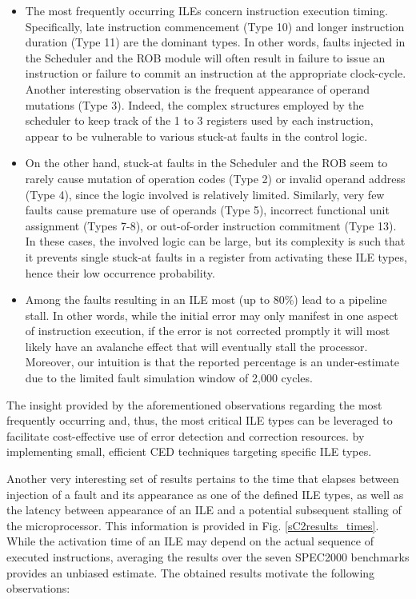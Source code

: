 \documentclass[12pt]{yalephd}
\newcommand{\snp}[1] {\noindent {\underline {#1}}}
\begin{document}
\begin{itemize}
\item The most frequently occurring ILEs concern instruction execution timing. Specifically, late instruction commencement (Type 10) and longer instruction duration (Type 11) are the dominant types. In other words, faults injected in the Scheduler and the ROB module will often result in failure to issue an instruction or failure to commit an instruction at the appropriate clock-cycle. Another interesting observation is the frequent appearance of operand mutations (Type 3). Indeed, the complex structures employed by the scheduler to keep track of the 1 to 3 registers used by each instruction, appear to be vulnerable to various stuck-at faults in the control logic.
\item On the other hand, stuck-at faults in the Scheduler and the ROB seem to rarely cause mutation of operation codes (Type 2) or invalid operand address (Type 4), since the logic involved is relatively limited. Similarly, very few faults cause premature use of operands (Type 5), incorrect functional unit assignment (Types 7-8), or out-of-order instruction commitment (Type 13). In these cases, the involved logic can be large, but its complexity is such that it prevents single stuck-at faults in a register from activating these ILE types, hence their low occurrence probability.
\item Among the faults resulting in an ILE most (up to 80\%) lead to a pipeline stall. In other words, while the initial error may only manifest in one aspect of instruction execution, if the error is not corrected promptly it will most likely have an avalanche effect that will eventually stall the processor. Moreover, our intuition is that the reported percentage is an under-estimate due to the limited fault simulation window of 2,000 cycles.
\end{itemize}

The insight provided by the aforementioned observations regarding the most frequently occurring and, thus, the most critical ILE types can be leveraged to facilitate cost-effective use of error detection and correction resources. by implementing small, efficient CED techniques targeting specific ILE types.

\snp{ILE Appearance Time:} Another very interesting set of results pertains to the time that elapses between injection of a fault and its appearance as one of the defined ILE types, as well as the latency between appearance of an ILE and a potential subsequent stalling of the microprocessor. This information is provided in Fig. \ref{sC2results_times}. While the activation time of an ILE may depend on the actual sequence of executed instructions, averaging the results over the seven SPEC2000 benchmarks provides an unbiased estimate. The obtained results motivate the following observations:
\end{document}
